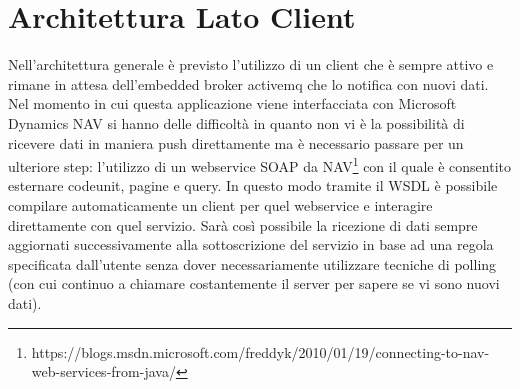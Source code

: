 \section{Architettura Lato Client}
Nell’architettura generale è previsto l’utilizzo di un client che è sempre attivo e rimane in attesa dell’embedded broker activemq che lo notifica con nuovi dati. Nel momento in cui questa applicazione viene interfacciata con Microsoft Dynamics NAV si hanno delle difficoltà in quanto non vi è la possibilità di ricevere dati in maniera push direttamente ma è necessario passare per un ulteriore step: l’utilizzo di un webservice SOAP da NAV\footnote{https://blogs.msdn.microsoft.com/freddyk/2010/01/19/connecting-to-nav-web-services-from-java/} con il quale è consentito esternare codeunit, pagine e query. In questo modo tramite il WSDL è possibile compilare automaticamente un client per quel webservice e interagire direttamente con quel servizio. Sarà così possibile la ricezione di dati sempre aggiornati successivamente alla sottoscrizione del servizio in base ad una regola specificata dall’utente senza dover necessariamente utilizzare tecniche di polling (con cui continuo a chiamare costantemente il server per sapere se vi sono nuovi dati).
